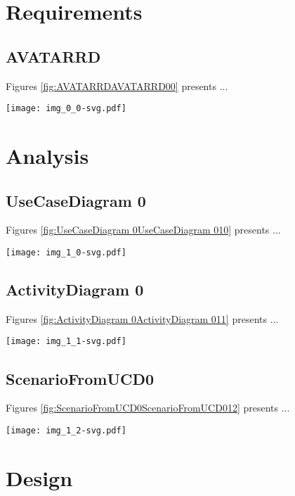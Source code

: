 
\section{Requirements}
\subsection{AVATARRD}
Figures \ref{fig:AVATARRDAVATARRD00} presents ...
\begin{figure*}[htb]
\centering
\texttt{[image: img\_0\_0-svg.pdf]}
\caption{Diagram "AVATARRD"}
\label{fig:AVATARRDAVATARRD00}
\end{figure*}

\section{Analysis}
\subsection{UseCaseDiagram 0}
Figures \ref{fig:UseCaseDiagram 0UseCaseDiagram 010} presents ...
\begin{figure*}[htb]
\centering
\texttt{[image: img\_1\_0-svg.pdf]}
\caption{Diagram "UseCaseDiagram 0"}
\label{fig:UseCaseDiagram 0UseCaseDiagram 010}
\end{figure*}

\subsection{ActivityDiagram 0}
Figures \ref{fig:ActivityDiagram 0ActivityDiagram 011} presents ...
\begin{figure*}[htb]
\centering
\texttt{[image: img\_1\_1-svg.pdf]}
\caption{Diagram "ActivityDiagram 0"}
\label{fig:ActivityDiagram 0ActivityDiagram 011}
\end{figure*}

\subsection{ScenarioFromUCD0}
Figures \ref{fig:ScenarioFromUCD0ScenarioFromUCD012} presents ...
\begin{figure*}[htb]
\centering
\texttt{[image: img\_1\_2-svg.pdf]}
\caption{Diagram "ScenarioFromUCD0"}
\label{fig:ScenarioFromUCD0ScenarioFromUCD012}
\end{figure*}

\section{Design}
